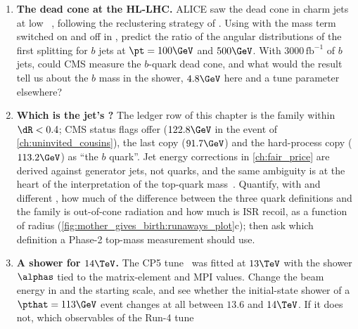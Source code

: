 \begin{enumerate}
    ordering of ISR changes the soft initial-state activity by a third
    (\cref{sec:mother_gives_birth:pythia}). Run the validation script with
    and without  and compare the \pt spectrum and
    rapidity of the hardest initial-state parton, the ``third jet'' of a
    dijet event. This is a region where the logarithmic accuracy of dipole
    showers is known to be deficient~\cite{Dasgupta:2018nvj,vanBeekveld:2022zhl};
    which existing CMS measurement constrains the option, and would a
    $14\TeV$ measurement of the third-jet rate at high rapidity do better?
  \item \textbf{The dead cone at the HL-LHC.} ALICE saw the dead cone in
    charm jets at low \pt~\cite{ALICE:2021aqk}, following the
    reclustering strategy of \cite{Maltoni:2016ays}. Using 
    with the mass term switched on and off in , predict
    the ratio of the angular distributions of the first splitting for $b$
    jets at $\pt=100\GeV$ and $500\GeV$. With $3000\,\mathrm{fb}^{-1}$ of
    $b$ jets, could CMS measure the $b$-quark dead cone, and what would the
    result tell us about the $b$ mass in the shower, $4.8\GeV$ here and a
    tune parameter elsewhere?
  \item \textbf{Which \pt is the jet's \pt?} The ledger row of this chapter
    is the family within $\dR<0.4$; CMS status flags offer
     ($122.8\GeV$ in the \CMSSW event of
    \cref{ch:uninvited_cousins}), the last
    copy ($91.7\GeV$) and the hard-process copy ($113.2\GeV$) as ``the $b$
    quark''. Jet energy corrections in \cref{ch:fair_price} are derived
    against generator jets, not quarks, and the same ambiguity is at the
    heart of the interpretation of the top-quark
    mass~\cite{Nason:2017cxd,Hoang:2020iah}. Quantify, with 
    and different , how much of the difference between the
    three quark definitions and the family is out-of-cone radiation and how
    much is ISR recoil, as a function of radius
    (\cref{fig:mother_gives_birth:runaways_plot}c); then ask which
    definition a Phase-2 top-mass measurement should use.
  \item \textbf{A shower for $14\TeV$.} The CP5 tune~\cite{CMS:2019csb}
    was fitted at $13\TeV$ with the shower $\alphas$ tied to the
    matrix-element and MPI values. Change the beam energy in
     and the starting scale, and see whether the
    initial-state shower of a $\pthat=113\GeV$ event changes at all between
    $13.6$ and $14\TeV$. If it does not, which observables of the Run-4 tune

\end{enumerate}
